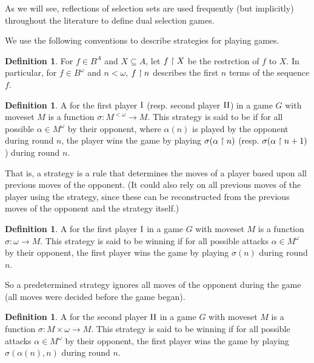 \documentclass{amsart}
\theoremstyle{plain}
\theoremstyle{definition}
\newtheorem{definition}[theorem]{Definition}
\theoremstyle{remark}
\theoremstyle{plain}
\theoremstyle{definition}
\theoremstyle{remark}
\begin{document}
As we will see, reflections of selection sets are used frequently (but implicitly) 
throughout the literature to define dual selection games.

We use the following conventions to describe strategies for playing games.

\begin{definition}
  For \(f\in B^A\) and \(X\subseteq A\), let \(f\restriction X\) be the restrction of \(f\)
  to \(X\). In particular, for \(f\in B^\omega\) and \(n<\omega\), \(f\restriction n\)
  describes the first \(n\) terms of the sequence \(f\).
\end{definition}

\begin{definition}
  A  for the first player \(\mathrm{I}\) (resp. second player \(\mathrm{II}\))
  in a game \(G\) with moveset \(M\) is a function
  \(\sigma:M^{<\omega}\to M\). This strategy is said to be  if
  for all possible  \(\alpha\in M^\omega\) by their opponent,
  where \(\alpha(n)\) is played by the opponent during round \(n\),
  the player wins the game by playing \(\sigma(\alpha\restriction n)\)
  (resp. \(\sigma(\alpha\restriction n+1)\)) during round \(n\).
\end{definition}

That is, a strategy is a rule that determines the moves of a player based upon
all previous moves of the opponent. (It could also rely on all previous
moves of the player using the strategy, since these can be reconstructed from
the previous moves of the opponent and the strategy itself.)

\begin{definition}
  A  for the first player \(\mathrm{I}\)
  in a game \(G\) with moveset \(M\) is a function
  \(\sigma:\omega\to M\). This strategy is said to be winning if
  for all possible attacks \(\alpha\in M^\omega\) by their opponent,
  the first player wins the game by playing \(\sigma(n)\)
  during round \(n\).
\end{definition}

So a predetermined strategy ignores all moves of the opponent during the
game (all moves were decided before the game began).

\begin{definition}
  A  for the second player \(\mathrm{II}\)
  in a game \(G\) with moveset \(M\) is a function
  \(\sigma:M\times\omega\to M\). This strategy is said to be winning if
  for all possible attacks \(\alpha\in M^\omega\) by their opponent,
  the first player wins the game by playing \(\sigma(\alpha(n),n)\)
  during round \(n\).
\end{definition}
\end{document}

